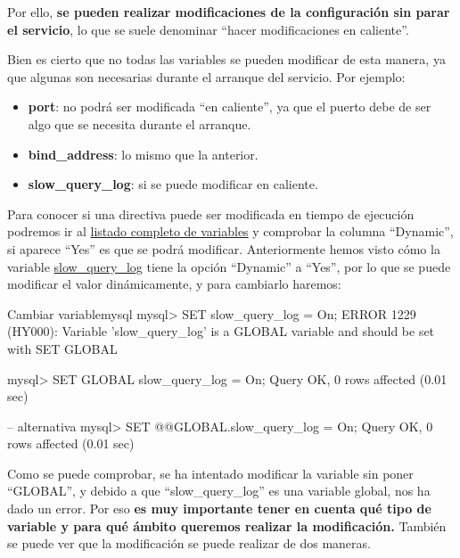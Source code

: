 Por ello, \textbf{se pueden realizar modificaciones de la configuración sin parar el servicio}, lo que se suele denominar “hacer modificaciones en caliente”.

Bien es cierto que no todas las variables se pueden modificar de esta manera, ya que algunas son necesarias durante el arranque del servicio. Por ejemplo:

\begin{itemize}
    \item \textbf{port}: no podrá ser modificada “en caliente”, ya que el puerto debe de ser algo que se necesita durante el arranque.
    \item \textbf{bind\_address}: lo mismo que la anterior.
    \item \textbf{slow\_query\_log}:  si se puede modificar en caliente.
\end{itemize}

Para conocer si una directiva puede ser modificada en tiempo de ejecución podremos ir al \href{https://dev.mysql.com/doc/refman/8.0/en/server-option-variable-reference.html}{listado completo de variables} y comprobar la columna “Dynamic”, si aparece “Yes” es que se podrá modificar. Anteriormente hemos visto cómo la variable \href{https://dev.mysql.com/doc/refman/8.0/en/server-system-variables.html#sysvar_slow_query_log}{slow\_query\_log} tiene la opción “Dynamic” a “Yes”, por lo que se puede modificar el valor dinámicamente, y para cambiarlo haremos:

\begin{mycode}{Cambiar variable}{mysql}{}
mysql> SET slow_query_log = On;
ERROR 1229 (HY000): Variable 'slow_query_log' is a GLOBAL variable
and should be set with SET GLOBAL


mysql> SET GLOBAL slow_query_log = On;
Query OK, 0 rows affected (0.01 sec)

-- alternativa
mysql> SET @@GLOBAL.slow_query_log = On;
Query OK, 0 rows affected (0.01 sec)
\end{mycode}

Como se puede comprobar, se ha intentado modificar la variable sin poner “GLOBAL”, y debido a que “slow\_query\_log” es una variable global, nos ha dado un error. Por eso \textbf{es muy importante tener en cuenta qué tipo de variable y para qué ámbito queremos realizar la modificación.} También se puede ver que la modificación se puede realizar de dos maneras.


